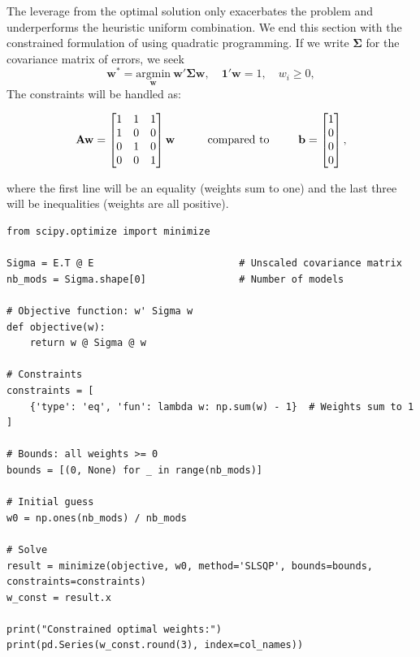 The leverage from the optimal solution only exacerbates the problem and underperforms the heuristic uniform combination. We end this section with the constrained formulation of \cite{breiman1996stacked} using quadratic programming. If we write $\mathbf{\Sigma}$ for the covariance matrix of errors, we seek
\begin{equation}
\mathbf{w}^*=\underset{\mathbf{w}}{\text{argmin}} \ \mathbf{w}'\mathbf{\Sigma}\mathbf{w}, \quad \mathbf{1}'\mathbf{w}=1, \quad w_i\ge 0,
\end{equation}
The constraints will be handled as:

\begin{equation}
\mathbf{A} \mathbf{w}= \begin{bmatrix} 
1 & 1 & 1 \\
1 & 0 & 0\\
0 & 1 & 0 \\
0 & 0 & 1
\end{bmatrix} \mathbf{w} \hspace{9mm} \text{ compared to} \hspace{9mm} \mathbf{b}=\begin{bmatrix} 1 \\ 0 \\ 0 \\ 0 \end{bmatrix},
\end{equation}

where the first line will be an equality (weights sum to one) and the last three will be inequalities (weights are all positive).

\begin{verbatim}
from scipy.optimize import minimize

Sigma = E.T @ E                         # Unscaled covariance matrix
nb_mods = Sigma.shape[0]                # Number of models

# Objective function: w' Sigma w
def objective(w):
    return w @ Sigma @ w

# Constraints
constraints = [
    {'type': 'eq', 'fun': lambda w: np.sum(w) - 1}  # Weights sum to 1
]

# Bounds: all weights >= 0
bounds = [(0, None) for _ in range(nb_mods)]

# Initial guess
w0 = np.ones(nb_mods) / nb_mods

# Solve
result = minimize(objective, w0, method='SLSQP', bounds=bounds, constraints=constraints)
w_const = result.x

print("Constrained optimal weights:")
print(pd.Series(w_const.round(3), index=col_names))
\end{verbatim}

